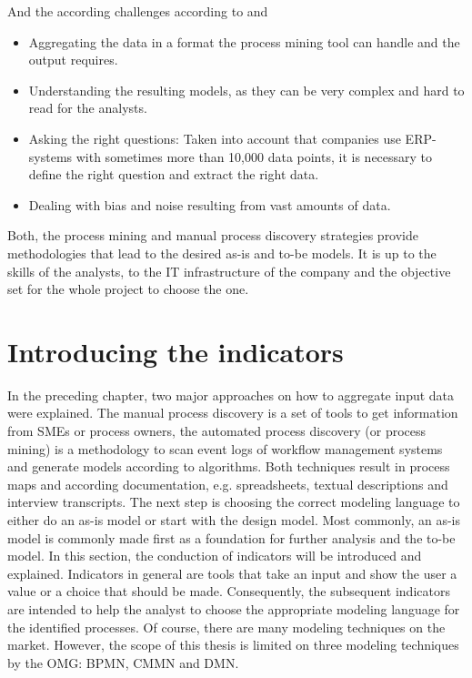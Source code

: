 And the according challenges according to \cite{manifesto2011} and \cite{Dumas2013}
\begin{itemize}
\item Aggregating the data in a format the process mining tool can handle and the output requires. 
\item Understanding the resulting models, as they can be very complex and hard to read for the analysts.
\item Asking the right questions: Taken into account that companies use ERP-systems with sometimes more than 10,000 data points, it is necessary to define the right question and extract the right data. 
\item Dealing with bias and noise resulting from vast amounts of data. 
\end{itemize}

Both, the process mining and manual process discovery strategies provide methodologies that lead to the desired as-is and to-be models. It is up to the skills of the analysts, to the IT infrastructure of the company and the objective set for the whole project to choose the one. 

\section{Introducing the indicators}
\label{section:indicator_introduction}
In the preceding chapter, two major approaches on how to aggregate input data were explained. The manual process discovery is a set of tools to get information from SMEs or process owners, the automated process discovery (or process mining) is a methodology to scan event logs of workflow management systems and generate models according to algorithms. Both techniques result in process maps and according documentation, e.g. spreadsheets, textual descriptions and interview transcripts. The next step is choosing the correct modeling language to either do an as-is model or start with the design model. Most commonly, an as-is model is commonly made first as a foundation for further analysis and the to-be model. 
In this section, the conduction of indicators will be introduced and explained. Indicators in general are tools that take an input and show the user a value or a choice that should be made. Consequently, the subsequent indicators are intended to help the analyst to choose the appropriate modeling language for the identified processes. Of course, there are many modeling techniques on the market. However, the scope of this thesis is limited on three modeling techniques by the \ac{OMG}: BPMN, CMMN and DMN. 

